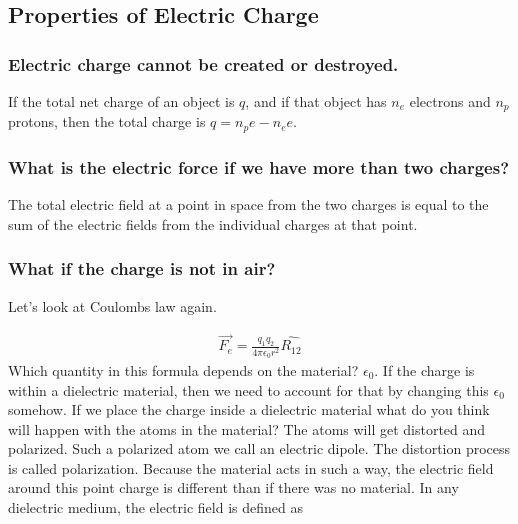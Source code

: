 \documentclass{ximera}
\begin{document}
\subsection{Properties of Electric Charge}

\subsubsection{Electric charge cannot be created or destroyed.} 

If the total net charge of an object is $q$, and if that object has $n_e$ electrons and $n_p$ protons, then the total charge is $q=n_p e-n_e e$. 



\subsubsection{What is the electric force if we have more than two charges?}

The total electric field at a point in space from the two charges is equal to the sum of the electric fields from the individual charges at that point.


\subsubsection{What if the charge is not in air?} 

Let's look at Coulombs law again. 


\begin{eqnarray}
\vec{F_e}=\frac{q_1 q_2}{4 \pi \epsilon_0 r^2} \hat{R_{12}}
\end{eqnarray}\label{Coulombslaw2}
Which quantity in this formula depends on the material? $\epsilon_0$. If the charge is within a dielectric material, then we need to account for that by changing this $\epsilon_0$ somehow. If we place the charge inside a dielectric material what do you think will happen with the atoms in the material? The atoms will get distorted and polarized. Such a polarized atom we call an electric dipole. The distortion process is called polarization. Because the material acts in such a way, the electric field around this point charge is different than if there was no material. In any dielectric medium, the electric field is defined as
\end{document}
